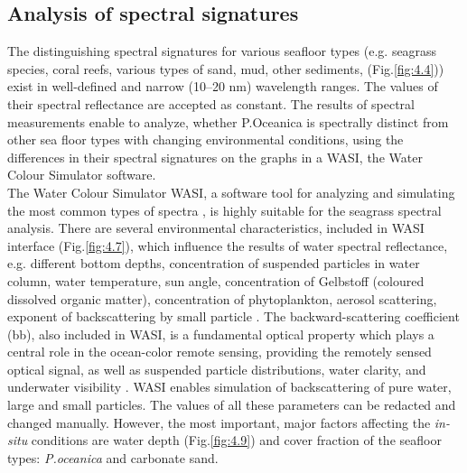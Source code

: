 \documentclass[10pt, a4paper]{article}
\begin{document}
\subsection{Analysis of spectral signatures}
The distinguishing spectral signatures for various seafloor types (e.g. seagrass species, coral reefs,
various types of sand, mud, other sediments, (Fig.\ref{fig:4.4})) exist in well-defined and narrow (10–20 nm)
wavelength ranges. 
The values of their spectral reflectance are accepted as constant. The results of
spectral measurements enable to analyze, whether P.Oceanica is spectrally distinct from other sea
floor types with changing environmental conditions, using the differences in their spectral signatures
on the graphs in a WASI, the Water Colour Simulator software. \\The Water Colour Simulator WASI, a
software tool for analyzing and simulating the most common types of spectra \cite{Gege05}\label{Gege05}, is highly
suitable for the seagrass spectral analysis.
There are several environmental characteristics, included in WASI interface (Fig.\ref{fig:4.7}), which influence the
results of water spectral reflectance, e.g. different bottom depths, concentration of suspended particles
in water column, water temperature, sun angle, concentration of Gelbstoff (coloured dissolved organic
matter), concentration of phytoplankton, aerosol scattering, exponent of backscattering by small
particle \cite{Gege04}\label{Gege04}. The backward-scattering coefficient (bb), also included in WASI, is a
fundamental optical property which plays a central role in the ocean-color remote sensing, providing
the remotely sensed optical signal, as well as suspended particle distributions, water clarity, and
underwater visibility \cite{Maffione97}\label{Maffione97}. WASI enables simulation of backscattering of pure
water, large and small particles. The values of all these parameters can be redacted and changed
manually. However, the most important, major factors affecting the \textit{in-situ} conditions are water depth (Fig.\ref{fig:4.9})
and cover fraction of the seafloor types: \textit{P.oceanica} and carbonate sand.
\end{document}
